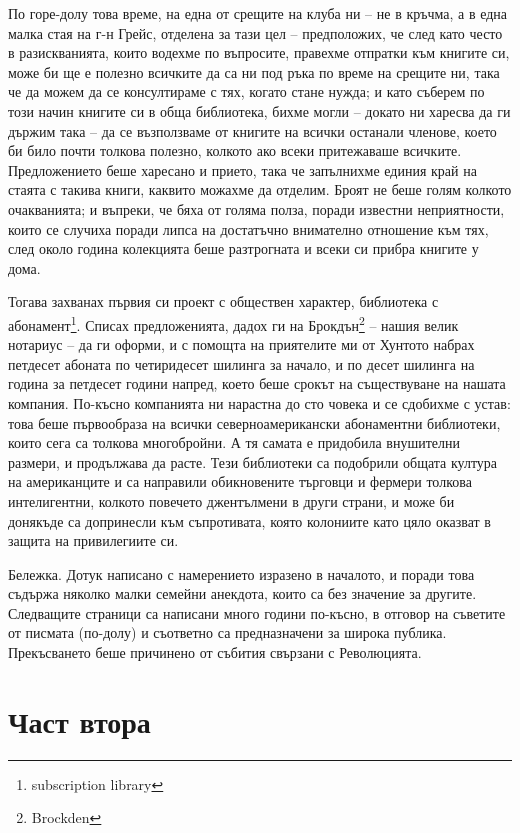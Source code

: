 \documentclass[12pt]{book}
\begin{document}
По горе-долу това време, на една от срещите на клуба ни – не в кръчма, а в една малка стая на г-н Грейс, отделена за тази цел – предположих, че след като често в разискванията, които водехме по въпросите, правехме отпратки към книгите си, може би ще е полезно всичките да са ни под ръка по време на срещите ни, така че да можем да се консултираме с тях, когато стане нужда; и като съберем по този начин книгите си в обща библиотека, бихме могли – докато ни харесва да ги държим така – да се възползваме от книгите на всички останали членове, което би било почти толкова полезно, колкото ако всеки притежаваше всичките. Предложението беше харесано и прието, така че запълнихме единия край на стаята с такива книги, каквито можахме да отделим. Броят не беше голям колкото очакванията; и въпреки, че бяха от голяма полза, поради известни неприятности, които се случиха поради липса на достатъчно внимателно отношение към тях, след около година колекцията беше разтрогната и всеки си прибра книгите у дома. 

Тогава захванах първия си проект с обществен характер, библиотека с абонамент\footnote{subscription library}. Списах предложенията, дадох ги на Брокдън\footnote{Brockden} – нашия  велик нотариус – да ги оформи, и с помощта на приятелите ми от Хунтото набрах петдесет абоната по четиридесет шилинга за начало, и по десет шилинга на година за петдесет години напред, което беше срокът на съществуване на нашата компания. По-късно компанията ни нарастна до сто човека и се сдобихме с устав: това беше първообраза на всички северноамерикански абонаментни библиотеки, които сега са толкова многобройни. А тя самата е придобила внушителни размери, и продължава да расте. Тези библиотеки са подобрили общата култура на американците и са направили обикновените търговци и фермери толкова интелигентни, колкото повечето джентълмени в други страни, и може би донякъде са допринесли към съпротивата, която колониите като цяло оказват в защита на привилегиите си.

Бележка. Дотук написано с намерението изразено в началото, и поради това съдържа няколко малки семейни анекдота, които са без значение за другите. Следващите страници са написани много години по-късно, в отговор на съветите от писмата (по-долу) и съответно са предназначени за широка публика. Прекъсването беше причинено от събития свързани с Революцията.

\chapter*{Част втора}
\end{document}
